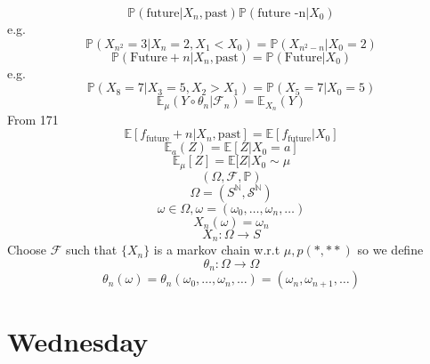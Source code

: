 \documentclass[11pt]{article}
\begin{document}
\[
    \mathbb{P}(\text{future} | X_n, \text{past}) \mathbb{P}( \text{future -n} |X_0)
\] 
e.g.
\[
    \mathbb{P}(X_{n^2} = 3 | X_n = 2, X_1 < X_0) = \mathbb{P}(X_{n^2 - n} | X_0 = 2)
\] 
\[
    \mathbb{P}(\text{Future} + n | X_n, \text{past}) = \mathbb{P}(\text{Future} | X_0)
\] 
e.g.
\[
\mathbb{P}(X_8 = 7 | X_3 =5, X_2 > X_1) = \mathbb{P}(X_5 = 7 | X_0 = 5)
\] 
\[
    \mathbb{E}_\mu( Y \circ \theta_n | \mathcal{F}_n) = \mathbb{E}_{X_n} (Y)
\] 
From 171
\[
    \mathbb{E}[f_{\text{future}}+n | X_n, \text{past}] = \mathbb{E}[f_{\text{future}} | X_0]
\] 
\[
\mathbb{E}_a(Z) = \mathbb{E}[Z | X_0 = a]
\] 
\[
    \mathbb{E}_\mu[Z] = \mathbb{E}[Z | X_0 \sim \mu
\] 
\[
    (\Omega, \mathcal{F}, \mathbb{P})
\] 
\[
    \Omega =  ( S^{ \mathbb{N}}, \mathcal{S}^{ \mathbb{N}})
\] 
\[
\omega \in \Omega, \omega = (\omega_0,\dots,\omega_n,\dots)
\] 
\[
X_n(\omega) = \omega_n
\] 
\[
X_n : \Omega \to S
\] 
Choose $ \mathcal{F}$ such that $\{X_n\}$ is a markov chain w.r.t  $\mu, p(*,**)$
so we define
\[
\theta_n : \Omega \to \Omega
\] 
\[
    \theta_n(\omega) = \theta_n(\omega_0,\dots,\omega_n,\dots) = (\omega_n,\omega_{n+1},\dots)
\] 

\section{Wednesday}
\end{document}
